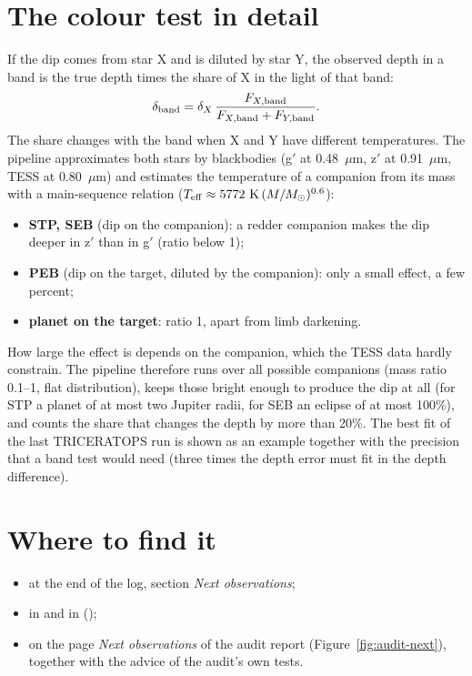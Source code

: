 \section{The colour test in detail}
If the dip comes from star X and is diluted by star Y, the observed depth in a
band is the true depth times the share of X in the light of that band:
\[
\delta_{\rm band} = \delta_X \,\frac{F_{X,{\rm band}}}{F_{X,{\rm band}} + F_{Y,{\rm band}}} .
\]
The share changes with the band when X and Y have different temperatures.
The pipeline approximates both stars by blackbodies (g$'$ at 0.48~$\mu$m,
z$'$ at 0.91~$\mu$m, TESS at 0.80~$\mu$m) and estimates the temperature of a
companion from its mass with a main-sequence relation
($T_{\rm eff} \approx 5772~{\rm K}\,(M/M_\odot)^{0.6}$):
\begin{itemize}
\item \textbf{STP, SEB} (dip on the companion): a redder companion makes the
dip deeper in z$'$ than in g$'$ (ratio below 1);
\item \textbf{PEB} (dip on the target, diluted by the companion): only a small
effect, a few percent;
\item \textbf{planet on the target}: ratio 1, apart from limb darkening.
\end{itemize}
How large the effect is depends on the companion, which the TESS data hardly
constrain. The pipeline therefore runs over all possible companions (mass
ratio 0.1--1, flat distribution), keeps those bright enough to produce the dip
at all (for STP a planet of at most two Jupiter radii, for SEB an eclipse of at
most 100\%), and counts the share that changes the depth by more than 20\%.
The best fit of the last TRICERATOPS run is shown as an example together with
the precision that a band test would need (three times the depth error must
fit in the depth difference).



\section{Where to find it}
\begin{itemize}
\item at the end of the log, section \emph{Next observations};
\item in  and in 
();
\item on the page \emph{Next observations} of the audit report
(Figure~\ref{fig:audit-next}), together with the advice of the audit's own
tests.
\end{itemize}

